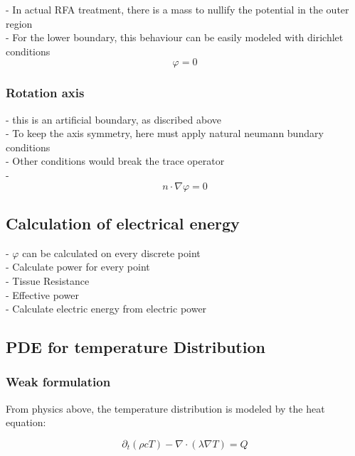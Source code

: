 \documentclass[parskip=half, titlepage=yes, 12pt, BCOR=12mm, DIV=calc]{scrartcl}
\begin{document}
- In actual RFA treatment, there is a mass to nullify the potential in the outer region \\
- For the lower boundary, this behaviour can be easily modeled with dirichlet conditions \\

\begin{equation}
    \varphi = 0
\end{equation}


\subsubsection{Rotation axis}

- this is an artificial boundary, as discribed above \\
- To keep the axis symmetry, here must apply natural neumann bundary conditions \\
- Other conditions would break the trace operator \\
- \begin{equation}
    n \cdot \nabla \varphi = 0
\end{equation}




\subsection{Calculation of electrical energy}

- $\varphi$ can be calculated on every discrete point \\
- Calculate power for every point \\
- Tissue Resistance \\
- Effective power \\
- Calculate electric energy from electric power \\




\subsection{PDE for temperature Distribution}

\subsubsection{Weak formulation}

From physics above, the temperature distribution is modeled by the heat equation: 

\begin{equation}
    \partial_t (\rho c T) - \nabla \cdot (\lambda \nabla T) = Q
\end{equation}
\end{document}

